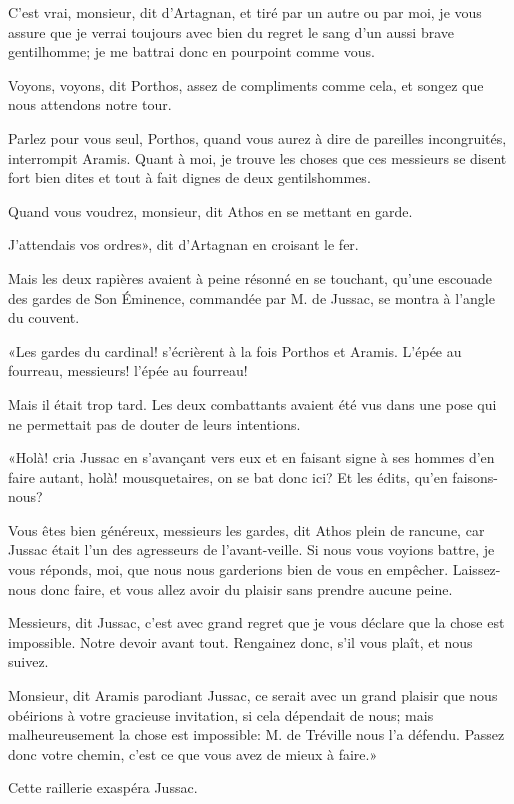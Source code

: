 \speak  C'est vrai, monsieur, dit d'Artagnan, et tiré par un autre ou par moi, je vous assure que je verrai toujours avec bien du regret le sang d'un aussi brave gentilhomme; je me battrai donc en pourpoint comme vous. 

\speak  Voyons, voyons, dit Porthos, assez de compliments comme cela, et songez que nous attendons notre tour. 

\speak  Parlez pour vous seul, Porthos, quand vous aurez à dire de pareilles incongruités, interrompit Aramis. Quant à moi, je trouve les choses que ces messieurs se disent fort bien dites et tout à fait dignes de deux gentilshommes. 

\speak  Quand vous voudrez, monsieur, dit Athos en se mettant en garde. 

\speak  J'attendais vos ordres», dit d'Artagnan en croisant le fer. 

Mais les deux rapières avaient à peine résonné en se touchant, qu'une escouade des gardes de Son Éminence, commandée par M. de Jussac, se montra à l'angle du couvent. 

«Les gardes du cardinal! s'écrièrent à la fois Porthos et Aramis. L'épée au fourreau, messieurs! l'épée au fourreau! 

Mais il était trop tard. Les deux combattants avaient été vus dans une pose qui ne permettait pas de douter de leurs intentions. 

«Holà! cria Jussac en s'avançant vers eux et en faisant signe à ses hommes d'en faire autant, holà! mousquetaires, on se bat donc ici? Et les édits, qu'en faisons-nous? 

\speak  Vous êtes bien généreux, messieurs les gardes, dit Athos plein de rancune, car Jussac était l'un des agresseurs de l'avant-veille. Si nous vous voyions battre, je vous réponds, moi, que nous nous garderions bien de vous en empêcher. Laissez-nous donc faire, et vous allez avoir du plaisir sans prendre aucune peine. 

\speak  Messieurs, dit Jussac, c'est avec grand regret que je vous déclare que la chose est impossible. Notre devoir avant tout. Rengainez donc, s'il vous plaît, et nous suivez. 

\speak  Monsieur, dit Aramis parodiant Jussac, ce serait avec un grand plaisir que nous obéirions à votre gracieuse invitation, si cela dépendait de nous; mais malheureusement la chose est impossible: M. de Tréville nous l'a défendu. Passez donc votre chemin, c'est ce que vous avez de mieux à faire.» 

Cette raillerie exaspéra Jussac. 

